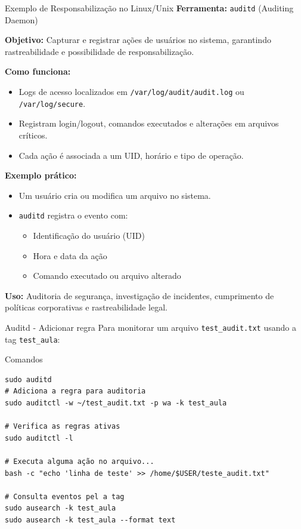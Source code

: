 \begin{frame}{Exemplo de Responsabilização no Linux/Unix}
    \textbf{Ferramenta:} \texttt{auditd} (Auditing Daemon)

    \medskip
    \textbf{Objetivo:} Capturar e registrar ações de usuários no sistema, garantindo rastreabilidade e possibilidade de responsabilização.

    \medskip
    \textbf{Como funciona:}
    \begin{itemize}
        \item Logs de acesso localizados em \texttt{/var/log/audit/audit.log} ou \texttt{/var/log/secure}.
        \item Registram login/logout, comandos executados e alterações em arquivos críticos.
        \item Cada ação é associada a um UID, horário e tipo de operação.
    \end{itemize}

    \medskip
    \textbf{Exemplo prático:}
    \begin{itemize}
        \item Um usuário cria ou modifica um arquivo no sistema.
        \item \texttt{auditd} registra o evento com:
              \begin{itemize}
                  \item Identificação do usuário (UID)
                  \item Hora e data da ação
                  \item Comando executado ou arquivo alterado
              \end{itemize}

    \end{itemize}

    \medskip
    \textbf{Uso:} Auditoria de segurança, investigação de incidentes, cumprimento de políticas corporativas e rastreabilidade legal.
\end{frame}

\begin{frame}[fragile]{Auditd - Adicionar regra }
    Para monitorar um arquivo \texttt{test\_audit.txt} usando a tag \texttt{test\_aula}:

    \begin{block}{Comandos}
        \begin{verbatim}
sudo auditd
# Adiciona a regra para auditoria
sudo auditctl -w ~/test_audit.txt -p wa -k test_aula

# Verifica as regras ativas
sudo auditctl -l

# Executa alguma ação no arquivo...
bash -c "echo 'linha de teste' >> /home/$USER/teste_audit.txt"

# Consulta eventos pel a tag
sudo ausearch -k test_aula
sudo ausearch -k test_aula --format text
\end{verbatim}
    \end{block}
\end{frame}


